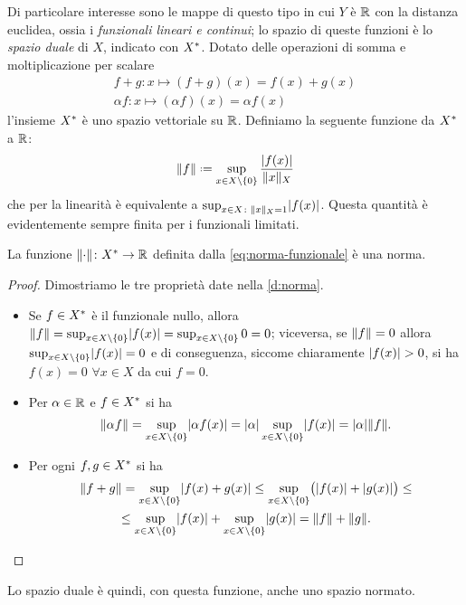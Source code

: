 Di particolare interesse sono le mappe di questo tipo in cui $Y$ è $\mathbb{R}$ con la distanza euclidea, ossia i \emph{funzionali lineari e continui}; lo spazio di queste funzioni è lo \emph{spazio duale} di $X$, indicato con $X^{\ast}$.
Dotato delle operazioni di somma e moltiplicazione per scalare
\begin{equation}
    \begin{gathered}
        f+g\colon x\mapsto (f+g)(x)=f(x)+g(x)\\
        \alpha f\colon x\mapsto (\alpha f)(x)=\alpha f(x)
    \end{gathered}
\end{equation}
l'insieme $X^{\ast}$ è uno spazio vettoriale su $\mathbb{R}$.
Definiamo la seguente funzione da $X^{\ast}$ a $\mathbb{R}$:
\begin{equation}
    \norm{f}\defeq\sup_{x\in X\setminus\{0\}}\frac{\abs{f(x)}}{\norm{x}_X}
    \label{eq:norma-funzionale}
\end{equation}
che per la linearità è equivalente a $\sup_{x\in X\colon \lVert x\rVert_X=1}\lvert f(x)\rvert$.
Questa quantità è evidentemente sempre finita per i funzionali limitati.
\begin{proprieta} \label{pr:norma-funzionale}
    La funzione $\lVert\cdot\rVert\colon X^{\ast}\to\mathbb{R}$ definita dalla \eqref{eq:norma-funzionale} è una norma.
\end{proprieta}
\begin{proof}
    Dimostriamo le tre proprietà date nella \ref{d:norma}.
    \begin{itemize}
        \item Se $f\in X^{\ast}$ è il funzionale nullo, allora $\lVert f\rVert=\sup_{x\in X\setminus\{0\}}\lvert f(x)\rvert=\sup_{x\in X\setminus\{0\}}0=0$; viceversa, se $\lVert f\rVert=0$ allora $\sup_{x\in X\setminus\{0\}}\lvert f(x)\rvert=0$ e di conseguenza, siccome chiaramente $\lvert f(x)\rvert>0$, si ha $f(x)=0$ $\forall x\in X$ da cui $f=0$.
        \item Per $\alpha\in\mathbb{R}$ e $f\in X^{\ast}$ si ha
            \begin{equation}
                \lVert\alpha f\rVert=
                \sup_{x\in X\setminus\{0\}}\lvert\alpha f(x)\rvert=
                \lvert\alpha\rvert\sup_{x\in X\setminus\{0\}}\lvert f(x)\rvert=
                \lvert\alpha\rvert\lVert f\rVert.
            \end{equation}
        \item Per ogni $f,g\in X^{\ast}$ si ha
            \begin{multline}
                \lVert f+g\rVert=
                \sup_{x\in X\setminus\{0\}}\lvert f(x)+g(x)\rvert\le
                \sup_{x\in X\setminus\{0\}}\bigl(\lvert f(x)\rvert+\lvert g(x)\rvert\bigr)\le\\ \le
                \sup_{x\in X\setminus\{0\}}\lvert f(x)\rvert+\sup_{x\in X\setminus\{0\}}\lvert g(x)\rvert=
                \lVert f\rVert+\lVert g\rVert.\qedhere
            \end{multline}
    \end{itemize}
\end{proof}
Lo spazio duale è quindi, con questa funzione, anche uno spazio normato.

